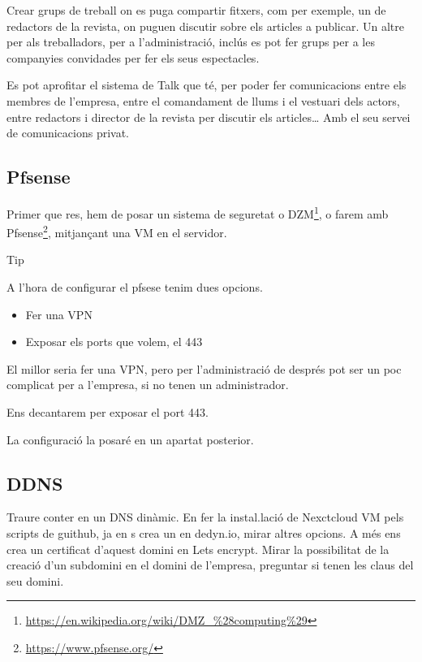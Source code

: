 \documentclass[
  10pt,
]{krantz}
\DeclareRobustCommand{\href}[2]{#2\footnote{\url{#1}}}
\providecommand{\tightlist}{%
  \setlength{\itemsep}{0pt}\setlength{\parskip}{0pt}}
\begin{document}
Crear grups de treball on es puga compartir fitxers, com per exemple, un de redactors de la revista, on puguen discutir sobre els articles a publicar. Un altre per als treballadors, per a l'administració, inclús es pot fer grups per a les companyies convidades per fer els seus espectacles.

Es pot aprofitar el sistema de Talk que té, per poder fer comunicacions entre els membres de l'empresa, entre el comandament de llums i el vestuari dels actors, entre redactors i director de la revista per discutir els articles\ldots{} Amb el seu servei de comunicacions privat.

\hypertarget{pfsense-1}{%
\subsection{Pfsense}\label{pfsense-1}}

Primer que res, hem de posar un sistema de seguretat o \href{https://en.wikipedia.org/wiki/DMZ_\%28computing\%29}{DZM}, o farem amb \href{https://www.pfsense.org/}{Pfsense}, mitjançant una VM en el servidor.

\begin{rmdtip}{Tip}

A l'hora de configurar el pfsese tenim dues opcions.

\begin{itemize}
\tightlist
\item
  Fer una VPN
\item
  Exposar els ports que volem, el 443
\end{itemize}

\end{rmdtip}

El millor seria fer una VPN, pero per l'administració de després pot ser un poc complicat per a l'empresa, si no tenen un administrador.

Ens decantarem per exposar el port 443.

La configuració la posaré en un apartat posterior.

\hypertarget{ddns}{%
\subsection{DDNS}\label{ddns}}

Traure conter en un DNS dinàmic. En fer la instal.lació de Nexctcloud VM pels scripts de guithub, ja en s crea un en dedyn.io, mirar altres opcions. A més ens crea un certificat d'aquest domini en Lets encrypt. Mirar la possibilitat de la creació d'un subdomini en el domini de l'empresa, preguntar si tenen les claus del seu domini.
\end{document}
